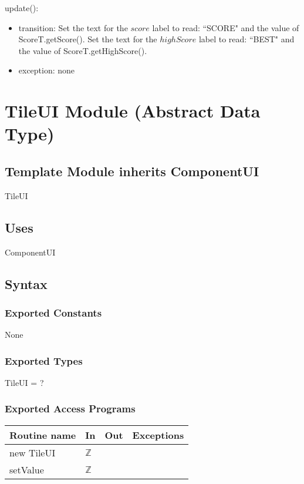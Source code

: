 \documentclass[12pt]{article}
\begin{document}
\noindent update():
\begin{itemize}
\item transition: Set the text for the $score$ label to read: ``SCORE" and the value of ScoreT.getScore(). Set the text for the $highScore$ label to read: ``BEST" and the value of  ScoreT.getHighScore().
\item exception: none
\end{itemize}

\newpage

\section* {TileUI Module (Abstract Data Type)}

\subsection*{Template Module inherits ComponentUI}

TileUI

\subsection* {Uses}

ComponentUI

\subsection* {Syntax}

\subsubsection* {Exported Constants}

None

\subsubsection* {Exported Types}

TileUI = ?

\subsubsection* {Exported Access Programs}

\begin{tabular}{| l | l | l | p{6cm} |}
\hline
\textbf{Routine name} & \textbf{In} & \textbf{Out} & \textbf{Exceptions}\\
\hline
new TileUI & $\mathbb{Z}$ & &  \\ \hline
setValue & $\mathbb{Z}$ & & \\
\hline
\end{tabular}
\end{document}
